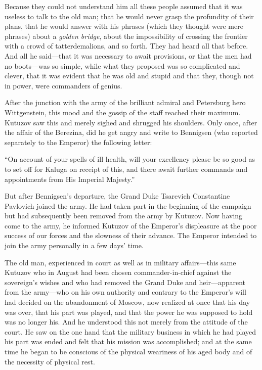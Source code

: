 Because they could not understand him all these people assumed
that it was useless to talk to the old man; that he would never
grasp the profundity of their plans, that he would answer with
his phrases (which they thought were mere phrases) about a
\emph{golden bridge}, about the impossibility of crossing the
frontier with a crowd of tatterdemalions, and so forth. They had
heard all that before. And all he said---that it was necessary to
await provisions, or that the men had no boots---was so simple,
while what they proposed was so complicated and clever, that it
was evident that he was old and stupid and that they, though not
in power, were commanders of genius.

After the junction with the army of the brilliant admiral and
Petersburg hero Wittgenstein, this mood and the gossip of the
staff reached their maximum. Kutuzov saw this and merely sighed
and shrugged his shoulders.  Only once, after the affair of the
Berezina, did he get angry and write to Bennigsen (who reported
separately to the Emperor) the following letter:

``On account of your spells of ill health, will your excellency
please be so good as to set off for Kaluga on receipt of this,
and there await further commands and appointments from His
Imperial Majesty.''

But after Bennigsen's departure, the Grand Duke Tsarevich
Constantine Pavlovich joined the army. He had taken part in the
beginning of the campaign but had subsequently been removed from
the army by Kutuzov. Now having come to the army, he informed
Kutuzov of the Emperor's displeasure at the poor success of our
forces and the slowness of their advance. The Emperor intended to
join the army personally in a few days' time.

The old man, experienced in court as well as in military
affairs---this same Kutuzov who in August had been chosen
commander-in-chief against the sovereign's wishes and who had
removed the Grand Duke and heir---apparent from the army---who on
his own authority and contrary to the Emperor's will had decided
on the abandonment of Moscow, now realized at once that his day
was over, that his part was played, and that the power he was
supposed to hold was no longer his. And he understood this not
merely from the attitude of the court. He saw on the one hand
that the military business in which he had played his part was
ended and felt that his mission was accomplished; and at the same
time he began to be conscious of the physical weariness of his
aged body and of the necessity of physical rest.

